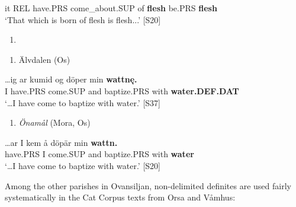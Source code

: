 it  REL  have.PRS  come\_about.SUP  of  \textbf{flesh} be.PRS  \textbf{flesh}\\ %


‘That which is born of flesh is flesh...’\textbf{ }[S20]\textbf{ }
\z

\begin{enumerate} %
\item 
\end{enumerate} %
\setcounter{listLFOxcviiileveli}{0}
\begin{enumerate} %
\item 
Älvdalen (Os)

\end{enumerate} %
\ea\label{}
\gll …ig  ar  kumid  og  döper  min  \textbf{wattnę.}\\


 I  have.PRS  come.SUP  and  baptize.PRS  with  \textbf{water.DEF.DAT}\\ %


‘…I have come to baptize with water.’ [S37]
\z

\begin{enumerate} %
\item 
\textit{Önamål} (Mora, Os)
\end{enumerate} %
\ea\label{}
\gll …ar  I  kem  å  döpär  min  \textbf{wattn.}\\


 have.PRS  I  come.SUP  and  baptize.PRS  with  \textbf{water}\\ %


‘…I have come to baptize with water.’ [S20]
\z

Among the other parishes in Ovansiljan, non-delimited definites are used fairly systematically in the Cat Corpus texts from Orsa and Våmhus: 

